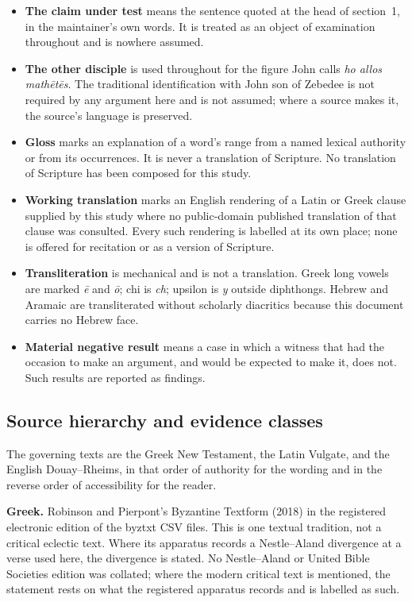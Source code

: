 \begin{itemize}
\item \textbf{The claim under test} means the sentence quoted at the head of
section~1, in the maintainer's own words. It is treated as an object of
examination throughout and is nowhere assumed.
\item \textbf{The other disciple} is used throughout for the figure John calls
\emph{ho allos math\=et\=es}. The traditional identification with John son of
Zebedee is not required by any argument here and is not assumed; where a source
makes it, the source's language is preserved.
\item \textbf{Gloss} marks an explanation of a word's range from a named lexical
authority or from its occurrences. It is never a translation of Scripture. No
translation of Scripture has been composed for this study.
\item \textbf{Working translation} marks an English rendering of a Latin or
Greek clause supplied by this study where no public-domain published
translation of that clause was consulted. Every such rendering is labelled at
its own place; none is offered for recitation or as a version of Scripture.
\item \textbf{Transliteration} is mechanical and is not a translation. Greek
long vowels are marked \emph{\=e} and \emph{\=o}; chi is \emph{ch}; upsilon is
\emph{y} outside diphthongs. Hebrew and Aramaic are transliterated without
scholarly diacritics because this document carries no Hebrew face.
\item \textbf{Material negative result} means a case in which a witness that had
the occasion to make an argument, and would be expected to make it, does not.
Such results are reported as findings.
\end{itemize}

\subsection{Source hierarchy and evidence classes}

The governing texts are the Greek New Testament, the Latin Vulgate, and the
English Douay--Rheims, in that order of authority for the wording and in the
reverse order of accessibility for the reader.

\textbf{Greek.} Robinson and Pierpont's Byzantine Textform (2018) in the
registered electronic edition of the byztxt CSV files. This is one textual
tradition, not a critical eclectic text. Where its apparatus records a
Nestle--Aland divergence at a verse used here, the divergence is stated. No
Nestle--Aland or United Bible Societies edition was collated; where the modern
critical text is mentioned, the statement rests on what the registered
apparatus records and is labelled as such.


